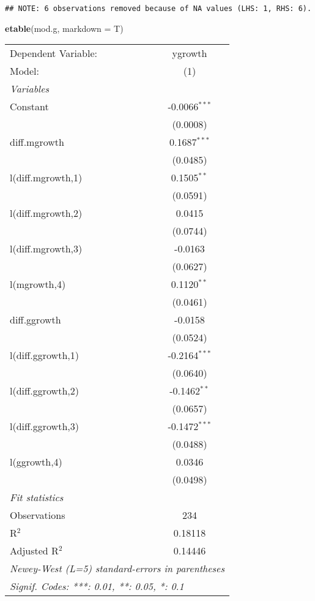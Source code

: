 \documentclass[
]{article}
\newenvironment{Shaded}{\begin{snugshade}}{\end{snugshade}}
\newcommand{\AttributeTok}[1]{\textcolor[rgb]{0.13,0.29,0.53}{#1}}
\newcommand{\FunctionTok}[1]{\textcolor[rgb]{0.13,0.29,0.53}{\textbf{#1}}}
\newcommand{\NormalTok}[1]{#1}
\begin{document}
\begin{verbatim}
## NOTE: 6 observations removed because of NA values (LHS: 1, RHS: 6).
\end{verbatim}

\begin{Shaded}
\begin{Highlighting}[]
\FunctionTok{etable}\NormalTok{(mod.g, }\AttributeTok{markdown =}\NormalTok{ T)}
\end{Highlighting}
\end{Shaded}

\begingroup
\centering
\begin{tabular}{lc}
   \tabularnewline \midrule \midrule
   Dependent Variable: & ygrowth\\  
   Model:              & (1)\\  
   \midrule
   \emph{Variables}\\
   Constant            & -0.0066$^{***}$\\   
                       & (0.0008)\\   
   diff.mgrowth        & 0.1687$^{***}$\\   
                       & (0.0485)\\   
   l(diff.mgrowth,1)   & 0.1505$^{**}$\\   
                       & (0.0591)\\   
   l(diff.mgrowth,2)   & 0.0415\\   
                       & (0.0744)\\   
   l(diff.mgrowth,3)   & -0.0163\\   
                       & (0.0627)\\   
   l(mgrowth,4)        & 0.1120$^{**}$\\   
                       & (0.0461)\\   
   diff.ggrowth        & -0.0158\\   
                       & (0.0524)\\   
   l(diff.ggrowth,1)   & -0.2164$^{***}$\\   
                       & (0.0640)\\   
   l(diff.ggrowth,2)   & -0.1462$^{**}$\\   
                       & (0.0657)\\   
   l(diff.ggrowth,3)   & -0.1472$^{***}$\\   
                       & (0.0488)\\   
   l(ggrowth,4)        & 0.0346\\   
                       & (0.0498)\\   
   \midrule
   \emph{Fit statistics}\\
   Observations        & 234\\  
   R$^2$               & 0.18118\\  
   Adjusted R$^2$      & 0.14446\\  
   \midrule \midrule
   \multicolumn{2}{l}{\emph{Newey-West (L=5) standard-errors in parentheses}}\\
   \multicolumn{2}{l}{\emph{Signif. Codes: ***: 0.01, **: 0.05, *: 0.1}}\\
\end{tabular}
\end{document}
